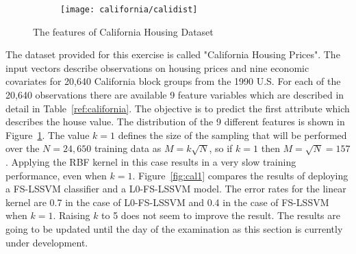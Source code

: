 \documentclass[conference,compsoc]{IEEEtran}
\begin{document}
\begin{figure}[htb]
    \centering %
\begin{subfigure}{0.9\textwidth}
  \texttt{[image: california/calidist]}
\end{subfigure}\hfil %
\caption{The features of California Housing Dataset}
\label{fig:calidist}
\end{figure}

The dataset provided for this exercise is called "California Housing Prices". The input vectors describe observations on housing prices and nine economic covariates for 20,640 California block groups from the 1990 U.S. For each of the 20,640 observations there are available 9 feature variables which are described in detail in Table~\ref{ref:california}. The objective is to predict the first attribute which describes the house value. The distribution of the 9 different features is shown in Figure~\ref{fig:calidist}. The value $k=1$ defines the size of the sampling that will be performed over the $N=24,650$ training data as $M=k\sqrt{N}$, so if $k=1$ then $M=\sqrt{N}=157$. Applying the RBF kernel in this case results in a very slow training performance, even when $k=1$. Figure~\ref{fig:cal1} compares the results of deploying a FS-LSSVM classifier and a L0-FS-LSSVM model. The error rates for the linear kernel are 0.7 in the case of L0-FS-LSSVM and 0.4 in the case of FS-LSSVM when $k=1$. Raising $k$ to 5 does not seem to improve the result. The results are going to be updated until the day of the examination as this section is currently under development.
\end{document}
